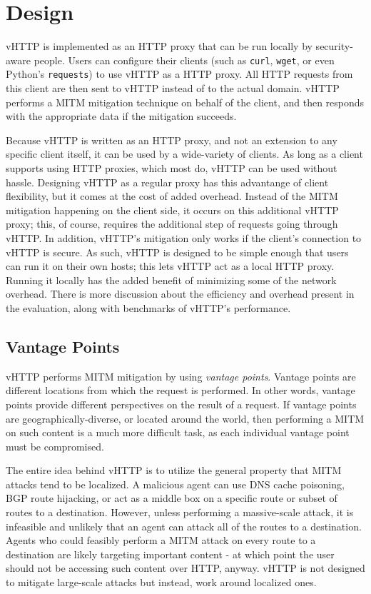 \section{Design}
\label{sec:design}

vHTTP is implemented as an HTTP proxy that can be run locally by security-aware
people. Users can configure their clients (such as \texttt{curl},
\texttt{wget}, or even Python's \texttt{requests}) to use vHTTP as a HTTP
proxy. All HTTP requests from this client are then sent to vHTTP instead of
to the actual domain. vHTTP performs a MITM mitigation technique on behalf of
the client, and then responds with the appropriate data if the mitigation
succeeds.

Because vHTTP is written as an HTTP proxy, and not an extension to any specific
client itself, it can be used by a wide-variety of clients. As long as a client
supports using HTTP proxies, which most do, vHTTP can be used without hassle.
Designing vHTTP as a regular proxy has this advantange of client flexibility,
but it comes at the cost of added overhead. Instead of the MITM mitigation
happening on the client side, it occurs on this additional vHTTP proxy; this,
of course, requires the additional step of requests going through vHTTP. In
addition, vHTTP's mitigation only works if the client's connection to vHTTP
is secure. As such, vHTTP is designed to be simple enough that users can run
it on their own hosts; this lets vHTTP act as a local HTTP proxy. Running it
locally has the added benefit of minimizing some of the network overhead. There
is more discussion about the efficiency and overhead present in the evaluation,
along with benchmarks of vHTTP's performance.

\subsection{Vantage Points}

vHTTP performs MITM mitigation by using \textit{vantage points}. Vantage points
are different locations from which the request is performed. In other words,
vantage points provide different perspectives on the result of a request. If
vantage points are geographically-diverse, or located around the world, then
performing a MITM on such content is a much more difficult task, as each
individual vantage point must be compromised.

The entire idea behind vHTTP is to utilize the general property that MITM
attacks tend to be localized. A malicious agent can use DNS cache poisoning,
BGP route hijacking, or act as a middle box on a specific route or subset of
routes to a destination. However, unless performing a massive-scale attack, it
is infeasible and unlikely that an agent can attack all of the routes to a
destination. Agents who could feasibly perform a MITM attack on every route to
a destination are likely targeting important content - at which point the user
should not be accessing such content over HTTP, anyway. vHTTP is not designed
to mitigate large-scale attacks but instead, work around localized ones.

